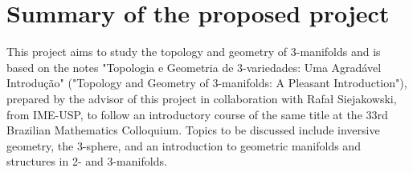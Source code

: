 \chapter{Summary of the proposed project}\label{chp:resumoProj} 

This project aims to study the topology and geometry of 3-manifolds and is based on the notes  \cite{Andre} "Topologia e Geometria de 3-variedades: Uma Agradável Introdução" ("Topology and Geometry of 3-manifolds: A Pleasant Introduction"), prepared by the advisor of this project in collaboration with Rafał Siejakowski, from IME-USP, to follow an introductory course of the same title at the 33rd Brazilian Mathematics Colloquium. Topics to be discussed include inversive geometry, the 3-sphere, and an introduction to geometric manifolds and structures in 2- and 3-manifolds.